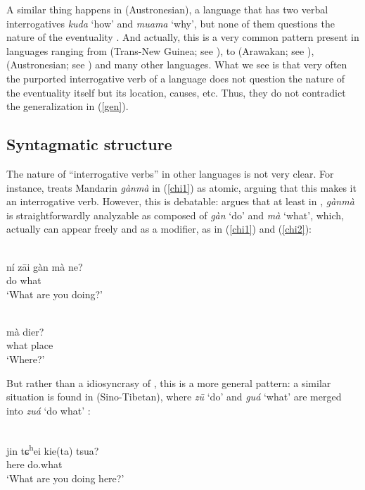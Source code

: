 \documentclass[output=paper]{langsci/langscibook}
\begin{document}
A similar thing happens in  (Austronesian), a language that has two
verbal interrogatives \emph{kuda} `how' and \emph{muama} `why', but none of
them questions the nature of the eventuality \citep{teng2007}. And actually,
this is a very common pattern present in languages ranging from 
(Trans-New Guinea; see \citealt{huber2011}), to  (Arawakan; see
\citealt{guerreiroetal2010}),  (Austronesian; see
\citealt{huang1996}) and many other languages. What we see is that very often
the purported interrogative verb of a language does not question the nature of
the eventuality itself but its location, causes, etc. Thus, they do not
contradict the generalization in (\ref{gen}).

\subsection{Syntagmatic structure}\label{syntagmatic}

The nature of ``interrogative verbs'' in other languages is not very clear. For
instance, \citet[2]{hagege2008} treats Mandarin \emph{gànmà} in (\ref{chi1}) as atomic, arguing that this makes it an interrogative verb. However, this is debatable: \citet[169]{luo2016} argues that at least in , \emph{g\`anm\`a} is straightforwardly analyzable as composed of \emph{g\`an} `do' and \emph{m\`a} `what', which, actually can appear freely and as a modifier, as in (\ref{chi1}) and (\ref{chi2}):
\begin{exe}
\ex \label{chi1} \\
\gll n\'i z\={a}i g\`an m\`a ne?\\
\Ssg{} \Prog{} do what \glossQ{}\\
\glt `What are you doing?'

\ex \label{chi2} \\
\gll m\`a dier?\\
what place\\
\glt `Where?'
\end{exe}

But rather than a idiosyncrasy of , this is a more
general pattern: a similar situation is found in  (Sino-Tibetan),
where \emph{z\={u}} `do' and \emph{gu\'a} `what' are merged into \emph{zu\'a}
`do what' \citep[170]{luo2016}:

\begin{exe}
\ex \label{yg}  \\
\gll jin tɕ\textsuperscript{h}ei kie(ta\ng) tsua?\\
    \Ssg{} \Prog{} here do.what\\
\glt `What are you doing here?'
\end{exe}
\end{document}
